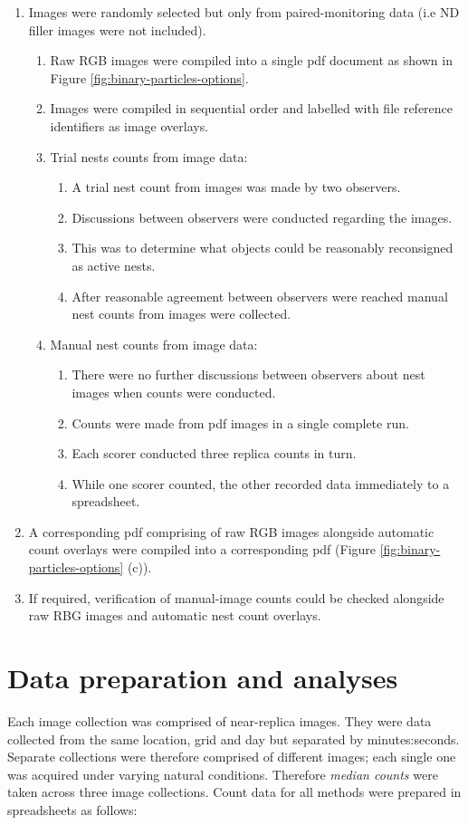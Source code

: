 \begin{enumerate}
\item Images were randomly selected but only from paired-monitoring data (i.e ND filler images were not included).
	\begin{enumerate}
	\item Raw \ac{RGB} images were compiled into a single pdf document as shown in Figure \ref{fig:binary-particles-options}.
	\item Images were compiled in sequential order and labelled with file reference identifiers as image overlays.
	\item Trial nests counts from image data:
		\begin{enumerate}
		\item A trial nest count from images was made by two observers.
		\item Discussions between observers were conducted regarding the images.
		\item This was to determine what objects could be reasonably reconsigned as active nests.
		\item After reasonable agreement between observers were reached manual nest counts from images were collected.
		\end{enumerate}
	\item Manual nest counts from image data:
		\begin{enumerate}
		\item There were no further discussions between observers about nest images when counts were conducted.
		\item Counts were made from pdf images in a single complete run.
		\item Each scorer conducted three replica counts in turn.
		\item While one scorer counted, the other recorded data immediately to a spreadsheet.
		\end{enumerate}
	\end{enumerate}
\item A corresponding pdf comprising of raw \ac{RGB} images alongside automatic count overlays were compiled into a corresponding pdf (Figure \ref{fig:binary-particles-options} (c)).
\item If required, verification of manual-image counts could be checked alongside raw RBG images and automatic nest count overlays.
\end{enumerate}


\section{Data preparation and analyses}\label{sec:data-preparation-for-analyses}
Each image collection was comprised of near-replica images. They were data collected from the same location, grid and day but separated by minutes:seconds. Separate collections were therefore comprised of different images; each single one was acquired under varying natural conditions. Therefore \emph{median counts} were taken across three image collections. Count data for all methods were prepared in spreadsheets as follows:


